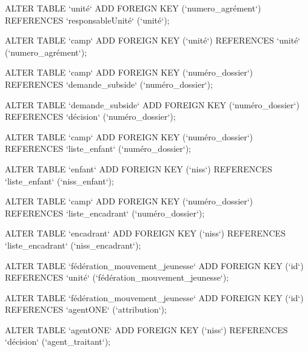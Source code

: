ALTER TABLE `unité` ADD FOREIGN KEY (`numero_agrément`) REFERENCES `responsableUnité` (`unité`);

ALTER TABLE `camp` ADD FOREIGN KEY (`unité`) REFERENCES `unité` (`numero_agrément`);

ALTER TABLE `camp` ADD FOREIGN KEY (`numéro_dossier`) REFERENCES `demande_subside` (`numéro_dossier`);

ALTER TABLE `demande_subside` ADD FOREIGN KEY (`numéro_dossier`) REFERENCES `décision` (`numéro_dossier`);

ALTER TABLE `camp` ADD FOREIGN KEY (`numéro_dossier`) REFERENCES `liste_enfant` (`numéro_dossier`);

ALTER TABLE `enfant` ADD FOREIGN KEY (`niss`) REFERENCES `liste_enfant` (`niss_enfant`);

ALTER TABLE `camp` ADD FOREIGN KEY (`numéro_dossier`) REFERENCES `liste_encadrant` (`numéro_dossier`);

ALTER TABLE `encadrant` ADD FOREIGN KEY (`niss`) REFERENCES `liste_encadrant` (`niss_encadrant`);

ALTER TABLE `fédération_mouvement_jeunesse` ADD FOREIGN KEY (`id`) REFERENCES `unité` (`fédération_mouvement_jeunesse`);

ALTER TABLE `fédération_mouvement_jeunesse` ADD FOREIGN KEY (`id`) REFERENCES `agentONE` (`attribution`);

ALTER TABLE `agentONE` ADD FOREIGN KEY (`niss`) REFERENCES `décision` (`agent_traitant`);